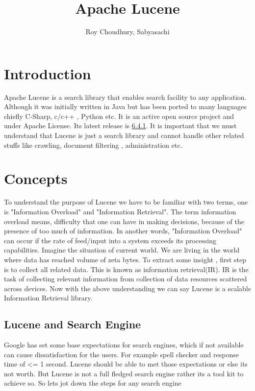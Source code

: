 \documentclass[9pt,twocolumn,twoside]{../../styles/osajnl}
\title{Apache Lucene}
\author[1,*, +]{Roy Choudhury, Sabyasachi}
\affil[1]{School of Informatics and Computing, Bloomington, IN 47408, U.S.A.}
\affil[*]{Corresponding authors: sabyroyc@indiana.edu}
\affil[+]{HID - S17-IO-3015}
\begin{document}
\maketitle

\section{Introduction}

Apache Lucene is a search library that enables search facility to any application. Although it was initially written in Java but has been ported to many languages chiefly C-Sharp, c/c++ , Python etc. It is an active open source project and under Apache License. Its latest release is \href{http://lucene.apache.org/core/6_4_1/index.html}{6.4.1}. It is important that we must understand that Lucene is just a search library and cannot handle other related stuffs like crawling, document filtering , administration etc.

\section{Concepts}
To understand the purpose of Lucene we have to be familiar with two terms, one is "Information Overload" and "Information Retrieval"\cite{wiki-ir}. The term information overload means, difficulty that one can have in making decisions, because of the presence of too much of information. In another words, "Information Overload" can occur if the rate of feed/input into a system exceeds its processing capabilities. Imagine the situation of current world. We are living in the world where data has reached volume of zeta bytes. To extract some insight , first step is to collect all related data. This is known as information retrieval(IR). IR is the task of collecting relevant information from collection of data resources scattered across devices. Now with the above understanding we can say Lucene is a scalable Information Retrieval library.

\subsection{Lucene and Search Engine}
Google has set some base expectations for search engines, which if not available can cause dissatisfaction for the users. For example spell checker and response time of <= 1 second. Lucene should be able to met those expectations or else its not worth. But Lucene is not a full fledged search engine rather its a tool kit to achieve so. So lets jot down the steps for any search engine 
\end{document}
